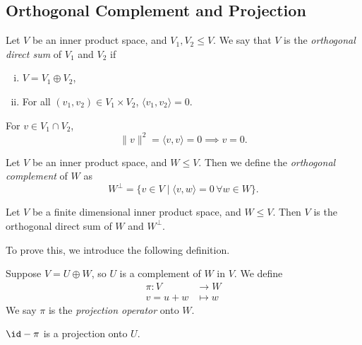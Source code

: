 \documentclass[12pt]{article}
\begin{document}
\subsection{Orthogonal Complement and Projection}
\label{sub:orthogonal_complement_and_projection}

\begin{definition}
	Let $V$ be an inner product space, and $V_1, V_2 \leq V$. We say that $V$ is the \textit{orthogonal direct sum} of $V_1$ and $V_2$ if
	\begin{enumerate}[(i)]
		\item $V = V_1 \oplus V_2$,
		\item For all $(v_1, v_2) \in V_1 \times V_2$, $\langle v_1, v_2 \rangle = 0$.
	\end{enumerate}
\end{definition}

\begin{remark}
	For $v \in V_1 \cap V_2$,
	\[
	\|v\|^2 = \langle v , v \rangle = 0 \implies v = 0
	.\]
\end{remark}

\begin{definition}
	Let $V$ be an inner product space, and $W \leq V$. Then we define the \textit{orthogonal complement} of $W$ as
	\[
		W^{\perp} = \{ v \in V \mid \langle v, w \rangle = 0 \, \forall w \in W\}
	.\]
\end{definition}

\begin{lemma}
	Let $V$ be a finite dimensional inner product space, and $W \leq V$. Then $V$ is the orthogonal direct sum of $W$ and $W^{\perp}$.
\end{lemma}

To prove this, we introduce the following definition.

\begin{definition}
	Suppose $V = U \oplus W$, so $U$ is a complement of $W$ in $V$. We define
	\begin{align*}
		\pi : V &\to W \\
		v = u + w &\mapsto w
	\end{align*}
	We say $\pi$ is the \textit{projection operator} onto $W$.
\end{definition}

\begin{remark} 
	$\id - \pi$ is a projection onto $U$.
\end{remark}
\end{document}
